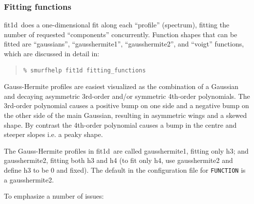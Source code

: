 \documentclass[twoside,11pt]{article}
\newcommand{\xref}[3]{#1}
\renewcommand{\_}{\texttt{\symbol{95}}}
\newenvironment{myquote}{\begin{quote}\begin{small}}{\end{small}\end{quote}}
\newcommand{\task}[1]{\textsf{#1}}
\newcommand{\fitdd}{\xref{\task{fit1d}}{sun258}{FIT1D}}
\newcommand{\cparam}[1]{\texttt{#1}}     %
\begin{document}
\subsubsection{Fitting functions}

\fitdd\ does a one-dimensional fit along each ``profile'' (spectrum),
fitting the number of requested ``components'' concurrently. Function
shapes that can be fitted are ``gaussians'', ``gausshermite1'',
``gausshermite2'', and ``voigt'' functions, which are discussed in
detail in:

\begin{myquote}
\begin{verbatim}
% smurfhelp fit1d fitting_functions
\end{verbatim}
\end{myquote}

Gauss-Hermite profiles are easiest visualized as the combination of a
Gaussian and decaying asymmetric 3rd-order and/or symmetric 4th-order
polynomials. The 3rd-order polynomial causes a positive bump on one
side and a negative bump on the other side of the main Gaussian,
resulting in asymmetric wings and a skewed shape. By contrast the
4th-order polynomial causes a bump in the centre and steeper slopes
i.e. a peaky shape.

The Gauss-Hermite profiles in \fitdd\ are called gausshermite1,
fitting only h3; and gausshermite2, fitting both h3 and h4 (to fit
only h4, use gausshermite2 and define h3 to be 0 and fixed). The
default in the configuration file for \cparam{FUNCTION} is a
gausshermite2.

To emphasize a number of issues:
\end{document}
